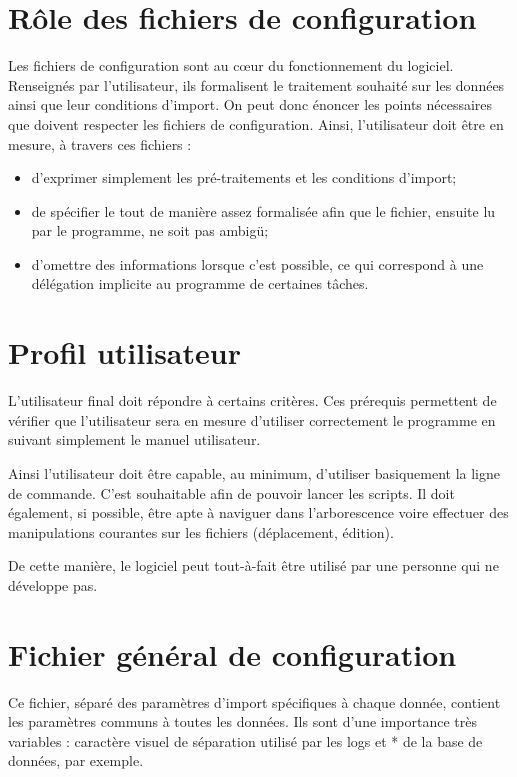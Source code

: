 \section{Rôle des fichiers de configuration}

Les fichiers de configuration sont au cœur du fonctionnement du logiciel. Renseignés par l'utilisateur, ils formalisent le traitement souhaité sur les données ainsi que leur conditions d'import. On peut donc énoncer les points nécessaires que doivent respecter les fichiers de configuration. Ainsi, l'utilisateur doit être en mesure, à travers ces fichiers :

\begin{itemize}
  \item d'exprimer simplement les pré-traitements et les conditions d'import;
  \item de spécifier le tout de manière assez formalisée afin que le fichier, ensuite lu par le programme, ne soit pas ambigü;
  \item d'omettre des informations lorsque c'est possible, ce qui correspond à une délégation implicite au programme de certaines tâches.
\end{itemize}

\section{Profil utilisateur}

L'utilisateur final doit répondre à certains critères. Ces prérequis permettent de vérifier que l'utilisateur sera en mesure d'utiliser correctement le programme en suivant simplement le manuel utilisateur.

Ainsi l'utilisateur doit être capable, au minimum, d'utiliser basiquement la ligne de commande. C'est souhaitable afin de pouvoir lancer les scripts. Il doit également, si possible, être apte à naviguer dans l'arborescence voire effectuer des manipulations courantes sur les fichiers (déplacement, édition).

De cette manière, le logiciel peut tout-à-fait être utilisé par une personne qui ne développe pas.

\section{Fichier général de configuration}

Ce fichier, séparé des paramètres d'import spécifiques à chaque donnée, contient les paramètres communs à toutes les données. Ils sont d'une importance très variables : caractère visuel de séparation utilisé par les logs et * de la base de données, par exemple.

